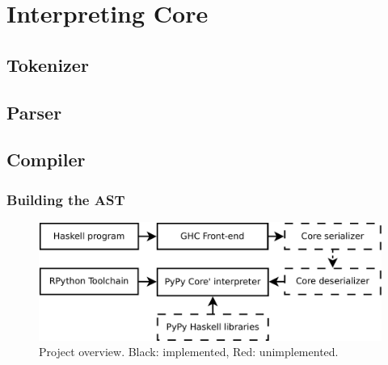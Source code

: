 
\section{Interpreting Core}

\subsection{Tokenizer}

\subsection{Parser}

\subsection{Compiler}

\subsubsection{Building the AST}


\begin{figure}
\includegraphics[width=\textwidth]{diags/overview.pdf}
\caption{Project overview. Black: implemented, Red: unimplemented.}
\end{figure}


